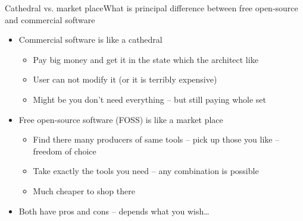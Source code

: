 \documentclass[compress, ucs, xelatex, 11pt, xcolor=svgnames,
  hyperref={
    bookmarks=true,
    unicode=true,
    colorlinks=true,
    pdftitle={Linux, command line and MetaCentrum},
    plainpages=false,
    pdfauthor={Vojtech Zeisek},
    pdfsubject={Course about use of Linux command line, writing shell scripts and using MetaCentrum of CESNET},
    pdfcreator={XeLaTeX},
    pdfkeywords={Linux, GNU, BASH, shell, command line, MetaCentrum},
    linkcolor=Red,
    anchorcolor=Blue,
    citecolor=Purple,
    filecolor=DodgerBlue,
    menucolor=DarkOrchid,
    urlcolor=DeepSkyBlue,
    pdftex},
  url={hyphens, lowtilde} %
  ]{beamer}
\begin{document}
\begin{frame}{Cathedral vs. market place}{What is principal difference between free open-source and commercial software}
\begin{itemize}
  \item Commercial software is like a cathedral
  \begin{itemize}
    \item Pay big money and get it in the state which the architect like
    \item User can not modify it (or it is terribly expensive)
    \item Might be you don't need everything -- but still paying whole set
  \end{itemize}
  \item Free open-source software (FOSS) is like a market place
  \begin{itemize}
    \item Find there many producers of same tools -- pick up those you like -- freedom of choice
    \item Take exactly the tools you need -- any combination is possible
    \item Much cheaper to shop there
  \end{itemize}
  \item Both have pros and cons -- depends what you wish\ldots
\end{itemize}
\end{frame}
\end{document}
